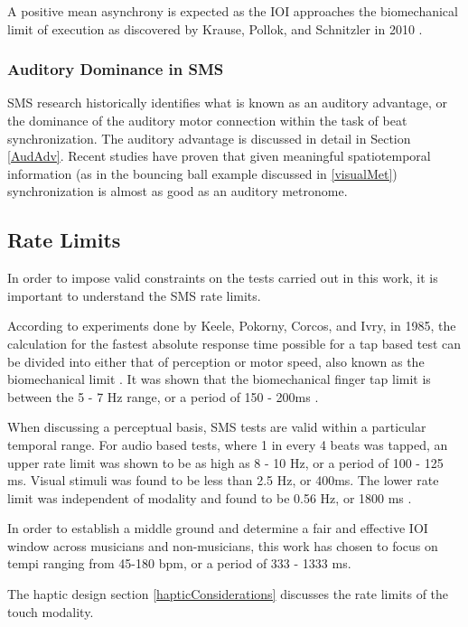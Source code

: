 A positive mean asynchrony is expected as the IOI approaches the biomechanical limit of execution as discovered by Krause, Pollok, and Schnitzler in 2010 \cite{krause2010perception}.

\subsubsection{Auditory Dominance in SMS}
SMS research historically identifies what is known as an auditory advantage, or the dominance of the auditory motor connection within the task of beat synchronization. The auditory advantage is discussed in detail in Section \ref{AudAdv}. Recent studies have proven that given meaningful spatiotemporal information (as in the bouncing ball example discussed in \ref{visualMet}) synchronization is almost as good as an auditory metronome.

\subsection{Rate Limits} \label{rateLimits}
In order to impose valid constraints on the tests carried out in this work, it is important to understand the SMS rate limits. 

According to experiments done by Keele, Pokorny, Corcos, and Ivry, in 1985, the calculation for the fastest absolute response time possible for a tap based test can be divided into either that of perception or motor speed, also known as the biomechanical limit \cite{keele1985perception}. It was shown that the biomechanical finger tap limit is between the 5 - 7 Hz range, or a period of 150 - 200ms \cite{repp2006rate}.

When discussing a perceptual basis, SMS tests are valid within a particular temporal range. For audio based tests, where 1 in every 4 beats was tapped, an upper rate limit was shown to be as high as 8 - 10 Hz, or a period of 100 - 125 ms. Visual stimuli was found to be less than 2.5 Hz, or 400ms. The lower rate limit was independent of modality and found to be 0.56 Hz, or 1800 ms \cite{repp2006rate}. 

In order to establish a middle ground and determine a fair and effective IOI window across musicians and non-musicians, this work has chosen to focus on tempi ranging from 45-180 bpm, or a period of 333 - 1333 ms.

The haptic design section \ref{hapticConsiderations} discusses the rate limits of the touch modality.